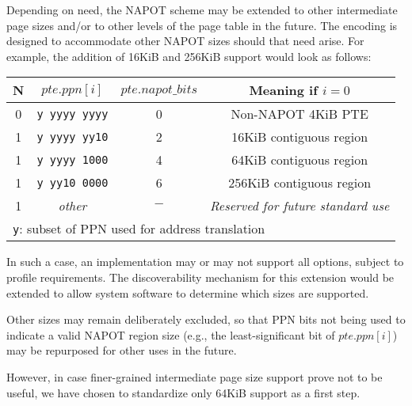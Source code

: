 \begin{commentary}
  Depending on need, the NAPOT scheme may be extended to other intermediate
  page sizes and/or to other levels of the page table in the future.  The
  encoding is designed to accommodate other NAPOT sizes should that need
  arise.  For example, the addition of 16KiB and 256KiB support would look
  as follows:

  \begin{center}\em
  \begin{tabular}{|c|c||c|c|}
  \hline
  N & $pte.ppn[i]$      & $pte.napot\_bits$ & Meaning if $i=0$         \\
  \hline
  0 & {\tt y~yyyy~yyyy} & 0                 &  Non-NAPOT 4KiB PTE      \\
  1 & {\tt y~yyyy~yy10} & 2                 &  16KiB contiguous region \\
  1 & {\tt y~yyyy~1000} & 4                 &  64KiB contiguous region \\
  1 & {\tt y~yy10~0000} & 6                 &  256KiB contiguous region \\
  1 & {\em other}       & $-$               &  {\em Reserved for future standard use} \\
  \hline
  \multicolumn{4}{l}{{\tt y}: subset of PPN used for address translation} \\
  \end{tabular}
  \end{center}

  In such a case, an implementation may or may not support all options, subject
  to profile requirements.  The discoverability mechanism for this extension
  would be extended to allow system software to determine which sizes are
  supported.

  Other sizes may remain deliberately excluded, so that PPN bits not being
  used to indicate a valid NAPOT region size (e.g., the least-significant bit
  of $pte.ppn[i]$) may be repurposed for other uses in the future.

  However, in case finer-grained intermediate page size support prove not to
  be useful, we have chosen to standardize only 64KiB support as a first step.
\end{commentary}

